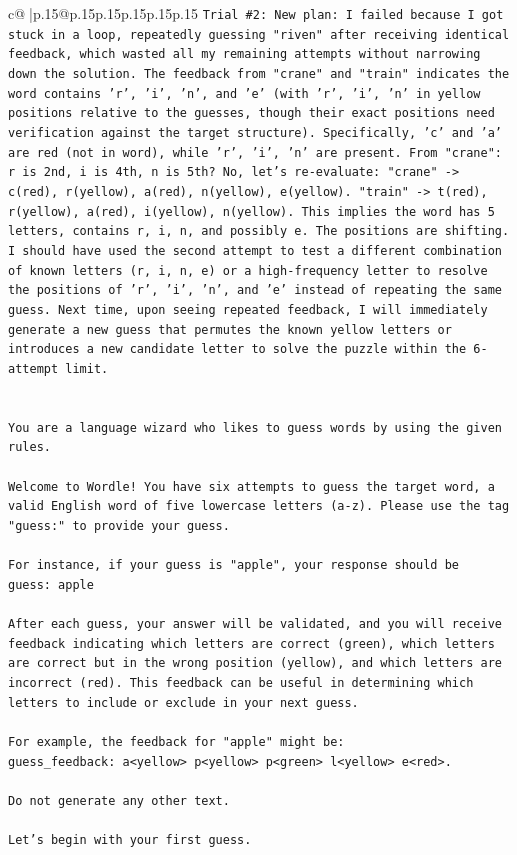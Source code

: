 \documentclass{article}
\begin{document}
{\begin{supertabular}{c@{$\;$}|p{.15\linewidth}@{}p{.15\linewidth}p{.15\linewidth}p{.15\linewidth}p{.15\linewidth}p{.15\linewidth}}
{{{\texttt{Trial \#2: New plan: I failed because I got stuck in a loop, repeatedly guessing "riven" after receiving identical feedback, which wasted all my remaining attempts without narrowing down the solution. The feedback from "crane" and "train" indicates the word contains 'r', 'i', 'n', and 'e' (with 'r', 'i', 'n' in yellow positions relative to the guesses, though their exact positions need verification against the target structure). Specifically, 'c' and 'a' are red (not in word), while 'r', 'i', 'n' are present. From "crane": r is 2nd, i is 4th, n is 5th? No, let's re{-}evaluate: "crane" {-}> c(red), r(yellow), a(red), n(yellow), e(yellow). "train" {-}> t(red), r(yellow), a(red), i(yellow), n(yellow). This implies the word has 5 letters, contains r, i, n, and possibly e. The positions are shifting. I should have used the second attempt to test a different combination of known letters (r, i, n, e) or a high{-}frequency letter to resolve the positions of 'r', 'i', 'n', and 'e' instead of repeating the same guess. Next time, upon seeing repeated feedback, I will immediately generate a new guess that permutes the known yellow letters or introduces a new candidate letter to solve the puzzle within the 6{-}attempt limit.} \\
\\ 
\\ 
\texttt{You are a language wizard who likes to guess words by using the given rules.} \\
\\ 
\texttt{Welcome to Wordle! You have six attempts to guess the target word, a valid English word of five lowercase letters (a{-}z). Please use the tag "guess:" to provide your guess.} \\
\\ 
\texttt{For instance, if your guess is "apple", your response should be} \\
\texttt{guess: apple} \\
\\ 
\texttt{After each guess, your answer will be validated, and you will receive feedback indicating which letters are correct (green), which letters are correct but in the wrong position (yellow), and which letters are incorrect (red). This feedback can be useful in determining which letters to include or exclude in your next guess.} \\
\\ 
\texttt{For example, the feedback for "apple" might be:} \\
\texttt{guess\_feedback: a<yellow> p<yellow> p<green> l<yellow> e<red>.} \\
\\ 
\texttt{Do not generate any other text.} \\
\\ 
\texttt{Let's begin with your first guess.} \\
            }
        }
    }
     \\ \\


\end{supertabular}}
\end{document}
